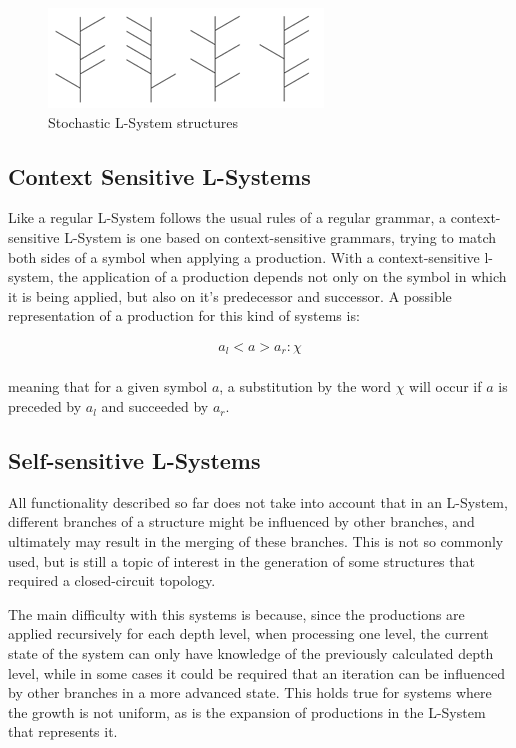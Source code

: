 \documentclass{acmtog}
\begin{document}
\begin{figure}[!htp]
  \begin{center}
    \includegraphics[width=0.6\columnwidth]{images/4_stochastic}
    \caption{Stochastic L-System structures \label{fig:stochastic}}
    \end{center}
\end{figure}

\subsection{Context Sensitive L-Systems}
\label{subsec:context}

Like a regular L-System follows the usual rules of a regular grammar, a context-sensitive L-System is one based on context-sensitive grammars, trying to match both sides of a symbol when applying a production. With a context-sensitive l-system, the application of a production depends not only on the symbol in which it is being applied, but also on it's predecessor and successor. A possible representation of a production for this kind of systems is:

\begin{eqnarray*}
  a_{l} < a > a_{r} : \chi \\
\end{eqnarray*}

meaning that for a given symbol $a$, a substitution by the word $\chi$ will occur if $a$ is preceded by $a_{l}$ and succeeded by $a_{r}$.


\subsection{Self-sensitive L-Systems}
\label{subsec:selfsensitive}

All functionality described so far does not take into account that in an L-System, different branches of a structure might be influenced by other branches, and ultimately may result in the merging of these branches. This is not so commonly used, but is still a topic of interest in the generation of some structures that required a closed-circuit topology.

The main difficulty with this systems is because, since the productions are applied recursively for each depth level, when processing one level, the current state of the system can only have knowledge of the previously calculated depth level, while in some cases it could be required that an iteration can be influenced by other branches in a more advanced state. This holds true for systems where the growth is not uniform, as is the expansion of productions in the L-System that represents it.
\end{document}
